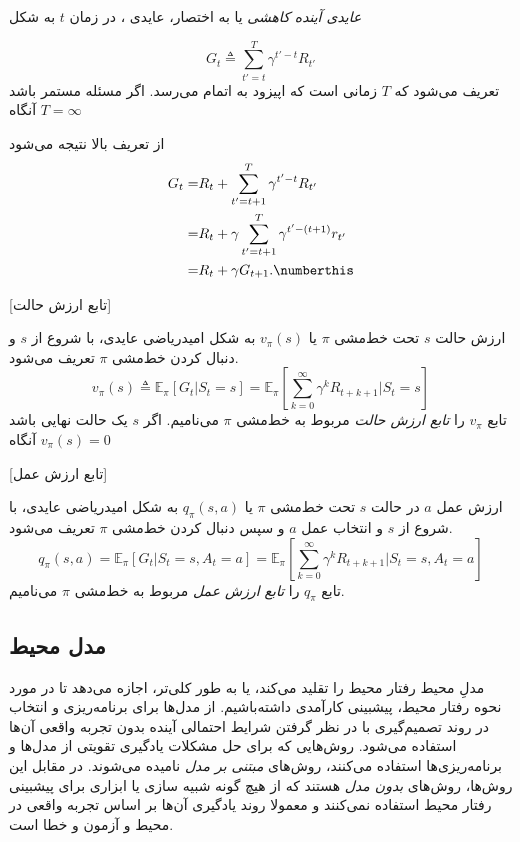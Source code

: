 \textit{عایدی آینده کاهشی}
 یا به اختصار، عایدی ، در زمان $t$ به شکل

$$G_t \triangleq \sum_{t'=t}^{T} \gamma^{t'-t} R_{t'}$$
تعریف می‌شود که $T$ زمانی است که اپیزود به اتمام می‌رسد. اگر مسئله مستمر باشد آنگاه 
$T=\infty$

از تعریف بالا نتیجه می‌شود 
\begin{align}
G_t =& R_t + \sum_{t'=t+1}^{T} \gamma^{t'-t} R_{t'} \nonumber \\
=& R_t + \gamma \sum_{t'=t+1}^{T} \gamma^{t' - (t+1)} r_{t'} \nonumber \\
=& R_t + \gamma G_{t+1}. \numberthis
\end{align}

[تابع ارزش حالت]

 ارزش حالت $s$ تحت خط‌مشی $\pi$ یا $v_\pi(s)$ به شکل امیدریاضی عایدی، با شروع از $s$ و دنبال کردن خط‌مشی $\pi$ تعریف می‌شود.
$$v_\pi(s) \triangleq \mathbb{E}_\pi\left[G_t| S_t=s\right] = \mathbb{E}_\pi\left[\sum_{k=0}^{\infty} \gamma^k R_{t+k+1}|S_t =s \right]$$
تابع $v_\pi$ را 
\textit{تابع ارزش حالت}
 مربوط به خط‌مشی 
$\pi$
می‌نامیم. اگر $s$ یک حالت نهایی باشد آنگاه 
$v_\pi(s) = 0$

\label{statevaluedef}

[تابع ارزش عمل]

ارزش عمل  $a$ در حالت
$s$
 تحت خط‌مشی $\pi$ یا 
 $q_\pi(s,a)$
  به شکل امیدریاضی عایدی، با شروع از $s$ و انتخاب عمل $a$  و سپس دنبال کردن خط‌مشی $\pi$ تعریف می‌شود.
$$q_\pi(s,a) = \mathbb{E}_\pi\left[G_t| S_t=s, A_t=a\right] = \mathbb{E}_\pi\left[\sum_{k=0}^{\infty} \gamma^k R_{t+k+1}|S_t =s, A_t=a \right]$$
تابع $q_\pi$ را 
\textit{تابع ارزش عمل}
 مربوط به خط‌مشی 
$\pi$
می‌نامیم.
\subsection{مدل محیط}

مدلِ محیط رفتار محیط را تقلید می‌کند، یا به طور کلی‌تر، اجازه می‌دهد تا در مورد نحوه رفتار محیط، پیشبینی کارآمدی داشته‌باشیم. از مدل‌ها برای برنامه‌ریزی و انتخاب در روند تصمیم‌گیری  با در نظر گرفتن شرایط احتمالی آینده بدون تجربه واقعی آن‌ها استفاده می‌شود.
روش‌هایی که برای حل مشکلات یادگیری تقویتی از مدل‌ها و برنامه‌ریزی‌ها استفاده می‌کنند، روش‌های 
\textit{مبتنی بر مدل}
 نامیده می‌شوند. در مقابل این روش‌ها، روش‌های 
\textit{بدون مدل}
  هستند که از هیچ گونه شبیه سازی  یا ابزاری برای پیشبینی رفتار محیط استفاده نمی‌کنند و معمولا روند یادگیری آن‌ها بر اساس تجربه واقعی در محیط و آزمون و خطا است.
